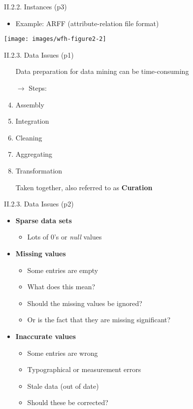 \documentclass[handout]{beamer}
\newcommand{\strong}[1]{\textbf{\color{teal} #1}}
\newcommand{\stronger}[1]{\textbf{\color{purple} #1}}
\begin{document}
\begin{frame}{II.2.2. Instances (p3)}
\begin{itemize}
\item Example: ARFF (attribute-relation file format)
\end{itemize}
\begin{center}
\texttt{[image: images/wfh-figure2-2]}
\cite[Fig 2.2]{WFH3:2011}
\end{center}
\end{frame}
\begin{frame}{II.2.3. Data Issues (p1)}
\begin{enumerate}
\item[] Data preparation for data mining can be time-consuming
\item[]
\item[$\rightarrow$] Steps:
\item Assembly
\item Integration
\item Cleaning
\item Aggregating
\item Transformation
\item[]
\item[] Taken together, also referred to as \stronger{Curation}
\end{enumerate}
\end{frame}
\begin{frame}{II.2.3. Data Issues (p2)}
\begin{itemize}
\item \strong{Sparse data sets}
	\begin{itemize}
	\item Lots of $0$'s or \emph{null} values
	\end{itemize}
\item \strong{Missing values}
	\begin{itemize}
	\item Some entries are empty
	\item What does this mean?
	\item Should the missing values be ignored?
	\item Or is the fact that they are missing significant?
	\end{itemize}
\item \strong{Inaccurate values}
	\begin{itemize}
	\item Some entries are wrong
	\item Typographical or measurement errors
	\item Stale data (out of date)
	\item Should these be corrected?
	\end{itemize}
\end{itemize}
\end{frame}
\end{document}

